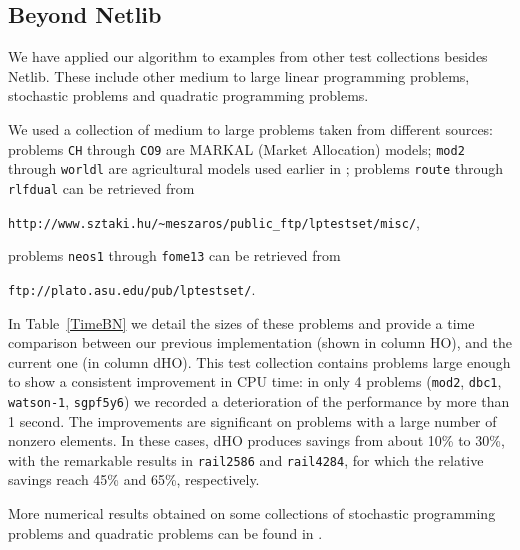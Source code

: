%
%
\subsection{Beyond Netlib}
\label{BN-tests}

We have applied our algorithm to examples from other test collections 
besides Netlib.
These include other medium to large linear programming problems, 
stochastic problems and quadratic programming problems.

We used a collection of medium to large problems taken from different
sources: problems {\tt CH} through {\tt CO9}
are MARKAL (Market Allocation) models; {\tt mod2} through {\tt worldl} are
agricultural models used earlier in \cite{Gondzio96}; problems {\tt route}
through {\tt rlfdual} can be retrieved from 
\begin{center}
{\tt http://www.sztaki.hu/\~{}meszaros/public\_ftp/lptestset/misc/},
\end{center}
problems {\tt neos1} through {\tt fome13} can be retrieved from 
\begin{center}
{\tt ftp://plato.asu.edu/pub/lptestset/}.
\end{center}

In Table~\ref{TimeBN} we detail the sizes of these problems and provide 
a time comparison between our previous implementation (shown in column
HO), and the current one (in column dHO).
This test collection contains problems large enough 
to show a consistent improvement in CPU time: in only 4 problems 
({\tt mod2}, {\tt dbc1}, {\tt watson-1}, {\tt sgpf5y6}) 
we recorded a deterioration of the performance by more than 1 second.
The improvements are significant on problems with a large 
number of nonzero elements. In these cases, dHO
produces savings from about 10\% to 30\%, with the remarkable results
in {\tt rail2586} and {\tt rail4284}, for which the relative savings 
reach 45\% and 65\%, respectively.

More numerical results obtained on some collections of stochastic
programming problems and quadratic problems can be found in
\cite{ColomboGondzio05}.

